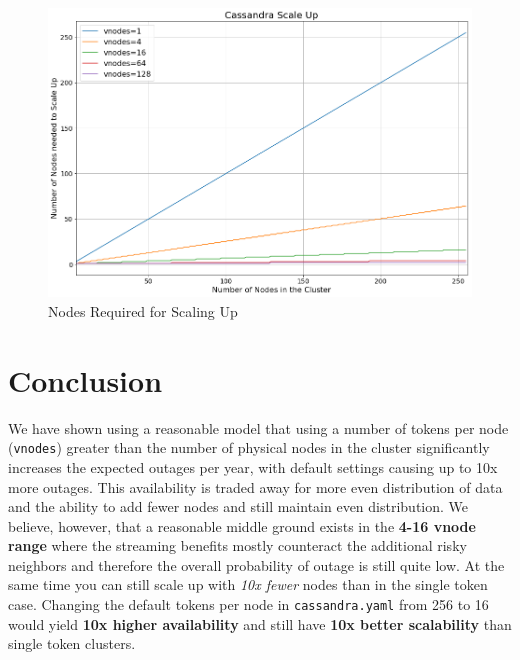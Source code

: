 \documentclass{article}
\begin{document}
\begin{figure}[H]
    \centering
    \includegraphics[width=1.0\textwidth]{images/scale_up.png}
    \caption{Nodes Required for Scaling Up}
    \label{fig:scaling}
\end{figure}


\section{Conclusion}
We have shown using a reasonable model that using a number of tokens per node (\texttt{vnodes}) greater than the number of physical nodes in the cluster significantly increases the expected outages per year, with default settings causing up to 10x more outages. This availability is traded away for more even distribution of data and the ability to add fewer nodes and still maintain even distribution. We believe, however, that a reasonable middle ground exists in the \textbf{4-16 vnode range} where the streaming benefits mostly counteract the additional risky neighbors and therefore the overall probability of outage is still quite low. At the same time you can still scale up with \textit{10x fewer} nodes than in the single token case. Changing the default tokens per node in \texttt{cassandra.yaml} from 256 to 16 would yield \textbf{10x higher availability} and still have \textbf{10x better scalability} than single token clusters.  
\end{document}
